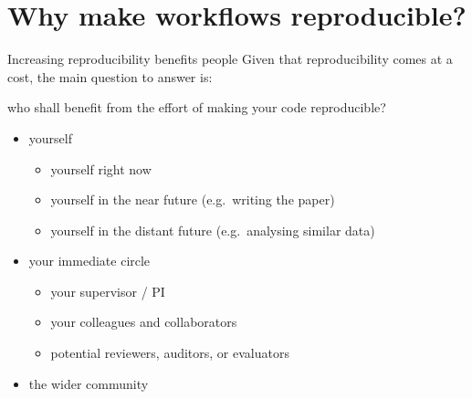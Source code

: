\documentclass[
  ignorenonframetext,
  aspectratio=169,
  t]{beamer}
\providecommand{\tightlist}{%
  \setlength{\itemsep}{0pt}\setlength{\parskip}{0pt}}
\begin{document}
\section{Why make workflows
reproducible?}\label{why-make-workflows-reproducible}

\begin{frame}{Increasing reproducibility benefits people}
\protect{}\label{increasing-reproducibility-benefits-people}
Given that reproducibility comes at a cost, the main question to answer
is:

\begin{block}{who shall benefit from the effort of making your code
reproducible?}
\protect{}\label{who-shall-benefit-from-the-effort-of-making-your-code-reproducible}
\pause

\begin{itemize}
\item
  yourself

  \begin{itemize}
  \tightlist
  \item[$\boxtimes$]
    yourself right now
  \item[$\square$]
    yourself in the near future (e.g.~writing the paper)
  \item[$\square$]
    yourself in the distant future (e.g.~analysing similar data)
  \end{itemize}
\end{itemize}

\pause

\vspace{0.5em}

\begin{itemize}
\item
  your immediate circle

  \begin{itemize}
  \tightlist
  \item[$\square$]
    your supervisor / PI
  \item[$\square$]
    your colleagues and collaborators
  \item[$\square$]
    potential reviewers, auditors, or evaluators
  \end{itemize}
\end{itemize}

\pause

\vspace{0.5em}

\begin{itemize}
\item
  the wider community


\end{itemize}
\end{block}
\end{frame}
\end{document}
